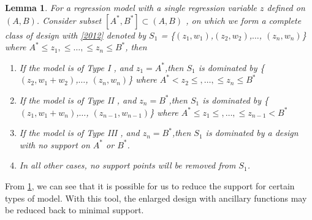 \documentclass[11pt]{amsart}
\newtheorem{lemma}[theorem]{Lemma}
\theoremstyle{definition}
\theoremstyle{remark}
\begin{document}
\begin{lemma}\label{removepts}
 For a regression model with a single regression variable $z$ defined on $(A,B)$. Consider subset $[A^*,B^*]\subset (A,B)$ , on which we form a complete class of design with \ref{2012} denoted by $S_1$ = \{$(z_1,w_1)$,$(z_2,w_2)$,$\ldots$, $(z_n,w_n)$\} where $A^*\le z_1,\le \ldots,\le z_n\le B^*$, then\begin{enumerate}
     
     \item If the model is of Type I , and $z_1=A^*$,then $S_1$ is dominated by \{$(z_2,w_1+w_2)$,$\ldots$, $(z_n,w_n)$\} where $A^*<z_2 \le,\ldots,\le z_n\le B^*$
     \item If the model is of Type II , and $z_n=B^*$,then $S_1$ is dominated by \{$(z_1,w_1+w_n)$,$\ldots$, $(z_{n-1},w_{n-1})$\} where $A^*\le z_1 \le,\ldots,\le z_{n-1}< B^*$
     \item If the model is of Type III , and $z_n=B^*$,then $S_1$ is dominated by a design with no support on $A^*$ or $B^*$.
     \item In all other cases, no support points will be removed from $S_1$.
 \end{enumerate}
\end{lemma}

From \ref{removepts}, we can see that it is possible for us to reduce the support for certain types of model. With this tool, the enlarged design with ancillary functions may be reduced back to minimal support. 

  

 

\end{document}
